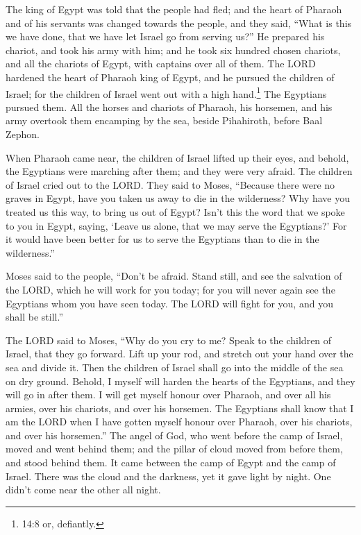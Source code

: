  The king of Egypt was told that the people had fled; and
the heart of Pharaoh and of his servants was changed towards the people,
and they said, ``What is this we have done, that we have let Israel go
from serving us?''  He prepared his chariot, and took his
army with him;  and he took six hundred chosen chariots, and
all the chariots of Egypt, with captains over all of them. 
The LORD hardened the heart of Pharaoh king of Egypt, and he pursued the
children of Israel; for the children of Israel went out with a high
hand.\footnote{14:8 or, defiantly.}  The Egyptians pursued
them. All the horses and chariots of Pharaoh, his horsemen, and his army
overtook them encamping by the sea, beside Pihahiroth, before Baal
Zephon.

 When Pharaoh came near, the children of Israel lifted up
their eyes, and behold, the Egyptians were marching after them; and they
were very afraid. The children of Israel cried out to the LORD.
 They said to Moses, ``Because there were no graves in
Egypt, have you taken us away to die in the wilderness? Why have you
treated us this way, to bring us out of Egypt?  Isn't this
the word that we spoke to you in Egypt, saying, `Leave us alone, that we
may serve the Egyptians?' For it would have been better for us to serve
the Egyptians than to die in the wilderness.''

 Moses said to the people, ``Don't be afraid. Stand still,
and see the salvation of the LORD, which he will work for you today; for
you will never again see the Egyptians whom you have seen today.
 The LORD will fight for you, and you shall be still.''

 The LORD said to Moses, ``Why do you cry to me? Speak to
the children of Israel, that they go forward.  Lift up your
rod, and stretch out your hand over the sea and divide it. Then the
children of Israel shall go into the middle of the sea on dry ground.
 Behold, I myself will harden the hearts of the Egyptians,
and they will go in after them. I will get myself honour over Pharaoh,
and over all his armies, over his chariots, and over his horsemen.
 The Egyptians shall know that I am the LORD when I have
gotten myself honour over Pharaoh, over his chariots, and over his
horsemen.''  The angel of God, who went before the camp of
Israel, moved and went behind them; and the pillar of cloud moved from
before them, and stood behind them.  It came between the
camp of Egypt and the camp of Israel. There was the cloud and the
darkness, yet it gave light by night. One didn't come near the other all
night.


